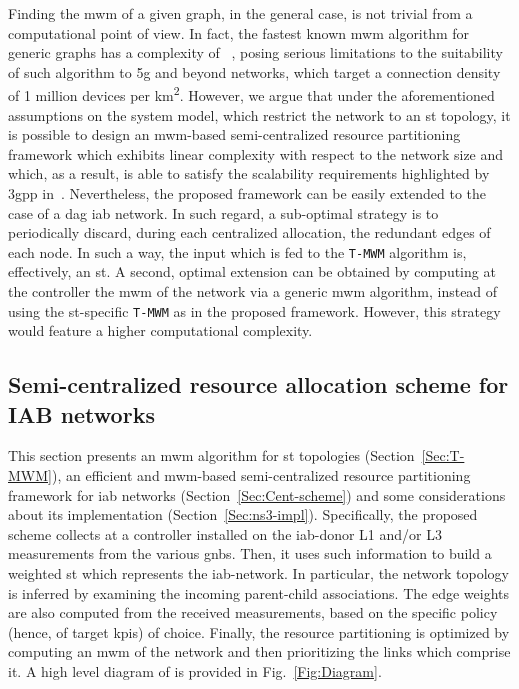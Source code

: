 Finding the \gls{mwm} of a given graph, in the general case, is not trivial from a computational point of view. 
In fact, the fastest known \gls{mwm} algorithm for generic graphs has a complexity of ~\cite{1990Gabow}, posing serious limitations to the suitability of such algorithm to \gls{5g} and beyond networks, which target a connection density of 1 million devices per km\textsuperscript{2}. However, we argue that under the aforementioned assumptions on the system model, which restrict the network to an \gls{st} topology, it is possible to design an \gls{mwm}-based semi-centralized resource partitioning framework which exhibits linear complexity with respect to the network size and which, as a result, is able to satisfy the scalability requirements highlighted by \gls{3gpp} in~\cite{3gpp_38_874}. 
Nevertheless, the proposed framework can be easily extended to the case of a \gls{dag} \gls{iab} network. In such regard, a sub-optimal strategy is to periodically discard, during each centralized allocation, the redundant edges of each node. In such a way, the input which is fed to the \texttt{T-MWM} algorithm is, effectively, an \gls{st}. A second, optimal extension can be obtained by computing at the controller the \gls{mwm} of the network via a generic \gls{mwm} algorithm, instead of using the \gls{st}-specific \texttt{T-MWM} as in the proposed framework. However, this strategy would feature a higher computational complexity.

\subsection{Semi-centralized resource allocation scheme for IAB networks}
\label{Sec:scheme_main}

This section presents an \gls{mwm} algorithm for \gls{st} topologies (Section~\ref{Sec:T-MWM}), an efficient and \gls{mwm}-based semi-centralized resource partitioning framework for \gls{iab} networks (Section~\ref{Sec:Cent-scheme}) and some considerations about its implementation (Section~\ref{Sec:ns3-impl}). 
Specifically, the proposed scheme collects at a controller installed on the \gls{iab}-donor L1 and/or L3 measurements from the various \glspl{gnb}. Then, it uses such information to build a weighted \gls{st} which represents the \gls{iab}-network. In particular, the network topology is inferred by examining the incoming parent-child associations. The edge weights are also computed from the received measurements, based on the specific policy (hence, of target \glspl{kpi}) of choice. Finally, the resource partitioning is optimized by computing an \gls{mwm} of the network and then prioritizing the links which comprise it. A high level diagram of is provided in Fig.~\ref{Fig:Diagram}.

